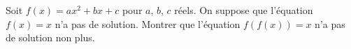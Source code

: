 Soit $f(x) = ax^2 + bx + c$ pour $a$, $b$, $c$ réels. On suppose que l'équation $f(x) = x$ n'a pas de solution. Montrer que l'équation $f(f(x)) = x$ n'a pas de solution non plus.
